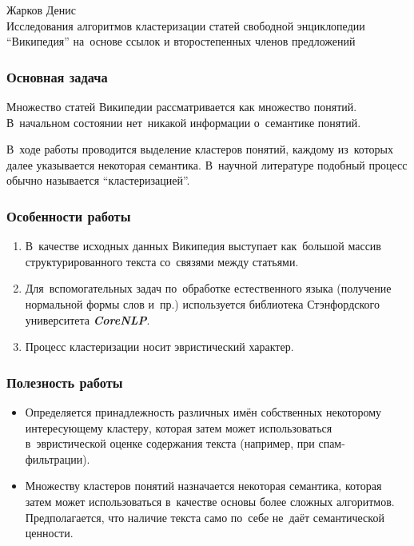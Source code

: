 \documentclass{beamer}
\newcommand{\MARK}[1]{{\bf {\it #1}}}
\begin{document}
\begin{frame}
\begin{center}
Жарков Денис\\
\vspace{1cm}
{\Large Исследования алгоритмов кластеризации статей свободной энциклопедии ``Википедия'' 
на~основе ссылок и второстепенных членов предложений}\\
\end{center}
\end{frame}

\begin{frame}
\frametitle{Основная задача}
Множество статей Википедии рассматривается как множество понятий.
В~начальном состоянии нет~никакой информации о~семантике понятий. 

\vspace{1cm}

В~ходе работы проводится выделение кластеров понятий, каждому из~которых далее указывается некоторая семантика.
В~научной литературе подобный процесс обычно называется ``кластеризацией''.
\end{frame}

\begin{frame}
\frametitle{Особенности работы}
\begin{enumerate}
\item {
В~качестве исходных данных Википедия выступает как~большой массив структурированного текста со~связями между статьями.
}

\item {
Для~вспомогательных задач по~обработке естественного языка (получение нормальной формы слов и~пр.) 
используется библиотека Стэнфордского университета \MARK{CoreNLP}.
}

\item{
Процесс кластеризации носит эвристический характер.
}
\end{enumerate}
\end{frame}

\begin{frame}
\frametitle{Полезность работы}

\begin{itemize}
\item {
Определяется принадлежность различных имён собственных некоторому интересующему кластеру,
которая затем может использоваться в~эвристической оценке содержания текста (например, при спам-фильтрации).
}

\item {
Множеству кластеров понятий назначается некоторая семантика, которая затем может использоваться в~качестве основы более сложных алгоритмов.
Предполагается, что наличие текста само по~себе не~даёт семантической ценности.
}
\end{itemize}

\end{frame}
\end{document}
